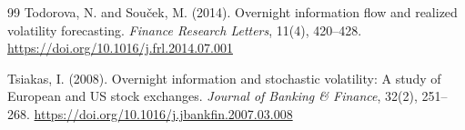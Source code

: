 \documentclass[11pt,a4paper]{article}
\begin{document}
\begin{thebibliography}{99}
Todorova, N. and Sou\v{c}ek, M. (2014).
\newblock Overnight information flow and realized volatility forecasting.
\newblock \emph{Finance Research Letters}, 11(4), 420--428.
\newblock \url{https://doi.org/10.1016/j.frl.2014.07.001}

Tsiakas, I. (2008).
\newblock Overnight information and stochastic volatility: A study of European and US stock exchanges.
\newblock \emph{Journal of Banking \& Finance}, 32(2), 251--268.
\newblock \url{https://doi.org/10.1016/j.jbankfin.2007.03.008}

\end{thebibliography}
\end{document}
